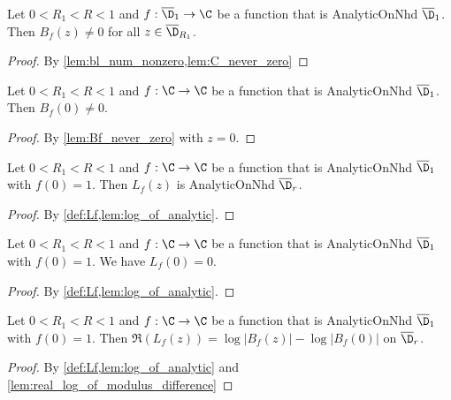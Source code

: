 \begin{lemma}\label{lem:Bf_never_zero}  \leanok
Let $0<R_1<R<1$ and $f:\overline{\D}_1\to\C$ be a function that is AnalyticOnNhd $\overline{\D}_1$. Then $B_f(z) \neq 0$ for all $z \in \overline{\D}_{R_1}$.
\end{lemma}
\begin{proof}
\leanok
By \cref{lem:bl_num_nonzero,lem:C_never_zero}
\end{proof}

\begin{lemma}[B zero]\label{lem:Bf0_not_zero}  \leanok
Let $0<R_1<R<1$ and $f:\C\to\C$ be a function that is AnalyticOnNhd $\overline{\D}_1$. Then $B_f(0) \neq 0$.
\end{lemma}
\begin{proof}
\leanok
By \cref{lem:Bf_never_zero} with $z=0$.
\end{proof}

\begin{lemma}[Lf analytic]\label{lem:Lf_is_analytic}  \leanok
Let $0<R_1<R<1$ and $f:\C\to\C$ be a function that is AnalyticOnNhd $\overline{\D}_1$ with $f(0)=1$. Then $L_f(z)$ is AnalyticOnNhd $\overline{\D}_{r}$.
\end{lemma}
\begin{proof}
\leanok
By \cref{def:Lf,lem:log_of_analytic}.
\end{proof}

\begin{lemma}[Lf at zero]\label{lem:Lf_at_0_is_0}  \leanok
Let $0<R_1<R<1$ and $f:\C\to\C$ be a function that is AnalyticOnNhd $\overline{\D}_1$ with $f(0)=1$. We have $L_f(0) = 0$.
\end{lemma}
\begin{proof} 
\leanok
By \cref{def:Lf,lem:log_of_analytic}.
\end{proof}


\begin{lemma}\label{lem:re_Lf_as_diff_of_log_mods}  \leanok
Let $0<R_1<R<1$ and $f:\C\to\C$ be a function that is AnalyticOnNhd $\overline{\D}_1$ with $f(0)=1$. Then $\Re(L_f(z)) = \log|B_f(z)| - \log|B_f(0)|$ on $\overline{\D}_{r}$.
\end{lemma}
\begin{proof}
\leanok
By \cref{def:Lf,lem:log_of_analytic} and \cref{lem:real_log_of_modulus_difference}
\end{proof}


